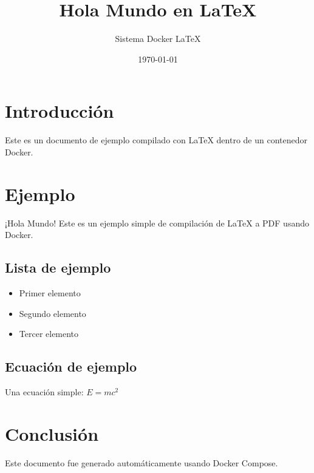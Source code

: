 \documentclass[12pt]{article}
\title{Hola Mundo en LaTeX}
\author{Sistema Docker LaTeX}
\date{\today}
\begin{document}
\maketitle

\section{Introducción}
Este es un documento de ejemplo compilado con LaTeX dentro de un contenedor Docker.

\section{Ejemplo}
¡Hola Mundo! Este es un ejemplo simple de compilación de LaTeX a PDF usando Docker.

\subsection{Lista de ejemplo}
\begin{itemize}
    \item Primer elemento
    \item Segundo elemento
    \item Tercer elemento
\end{itemize}

\subsection{Ecuación de ejemplo}
Una ecuación simple: $E = mc^2$

\section{Conclusión}
Este documento fue generado automáticamente usando Docker Compose.
\end{document}
